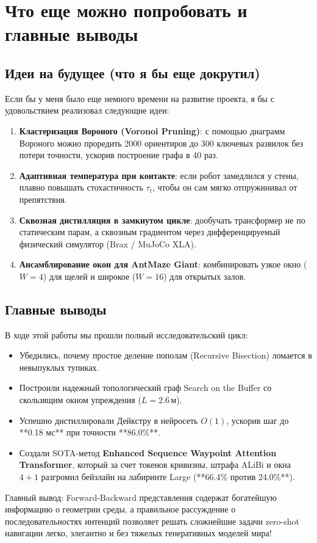 \section{Что еще можно попробовать и главные выводы}

\subsection{Идеи на будущее (что я бы еще докрутил)}

Если бы у меня было еще немного времени на развитие проекта, я бы с удовольствием реализовал следующие идеи:
\begin{enumerate}[leftmargin=*,noitemsep]
    \item \textbf{Кластеризация Вороного (Voronoi Pruning)}: с помощью диаграмм Вороного можно проредить 2000 ориентиров до 300 ключевых развилок без потери точности, ускорив построение графа в 40 раз.
    \item \textbf{Адаптивная температура при контакте}: если робот замедлился у стены, плавно повышать стохастичность $\tau_t$, чтобы он сам мягко отпружинивал от препятствия.
    \item \textbf{Сквозная дистилляция в замкнутом цикле}: дообучать трансформер не по статическим парам, а сквозным градиентом через дифференцируемый физический симулятор (Brax / MuJoCo XLA).
    \item \textbf{Ансамблирование окон для AntMaze Giant}: комбинировать узкое окно ($W=4$) для щелей и широкое ($W=16$) для открытых залов.
\end{enumerate}

\subsection{Главные выводы}

В ходе этой работы мы прошли полный исследовательский цикл:
\begin{itemize}[leftmargin=*,noitemsep]
    \item Убедились, почему простое деление пополам (Recursive Bisection) ломается в невыпуклых тупиках.
    \item Построили надежный топологический граф Search on the Buffer со скользящим окном упреждения ($L=2.6\,\text{м}$).
    \item Успешно дистиллировали Дейкстру в нейросеть $O(1)$, ускорив шаг до **0.18 мс** при точности **86.0\%**.
    \item Создали SOTA-метод \textbf{Enhanced Sequence Waypoint Attention Transformer}, который за счет токенов кривизны, штрафа ALiBi и окна $4+1$ разгромил бейзлайн на лабиринте Large (**66.4\% против 24.0\%**).
\end{itemize}

Главный вывод: Forward-Backward представления содержат богатейшую информацию о геометрии среды, а правильное рассуждение о последовательностях интенций позволяет решать сложнейшие задачи zero-shot навигации легко, элегантно и без тяжелых генеративных моделей мира!
